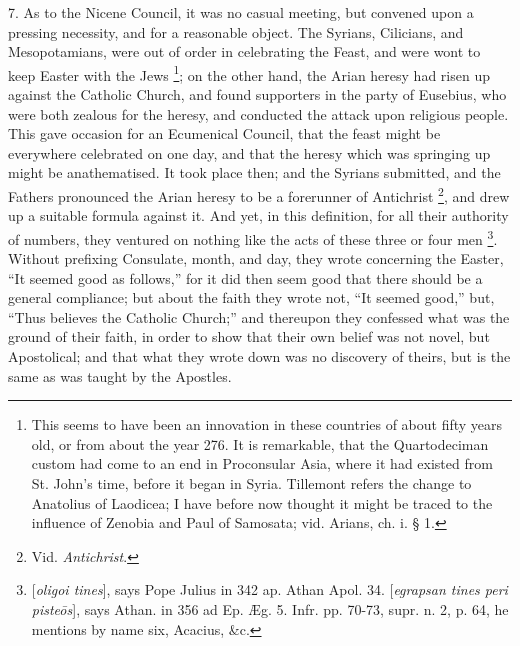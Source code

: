 7. As to the Nicene Council,
it was no casual meeting, but convened upon a pressing necessity, and
for a reasonable object. The Syrians, Cilicians, and Mesopotamians,
were out of order in celebrating the Feast, and were wont to keep
Easter with the Jews \footnote{This seems to have been an innovation in these countries of about
fifty years old, or from about the year 276. It is remarkable, that
the Quartodeciman custom had come to an end in Proconsular Asia, where
it had existed from St. John's time, before it began in Syria.
Tillemont refers the change to Anatolius of Laodicea; I have before
now thought it might be traced to the influence of Zenobia and Paul of
Samosata; vid. Arians, ch. i. § 1.}; on
the other hand, the Arian heresy had risen up against the
Catholic Church, and found supporters in the party of Eusebius, who
were both zealous for the heresy, and conducted the attack upon
religious people. This gave occasion for an Ecumenical Council, that
the feast might be everywhere celebrated on one day, and that the
heresy which was springing up might be anathematised. It took place
then; and the Syrians submitted, and the Fathers pronounced the Arian
heresy to be a forerunner of Antichrist \footnote{Vid. \emph{Antichrist}.}, and drew up a suitable formula against it. And yet, in this
definition, for all their authority of numbers, they ventured on
nothing like the acts of these three or four men \footnote{[\emph{oligoi tines}], says Pope Julius in 342 ap. Athan Apol. 34. [\emph{egrapsan
tines peri piste\={o}s}], says Athan. in 356 ad Ep. Æg. 5. Infr.
pp. 70-73, supr. n. 2, p. 64, he mentions by name six, Acacius,
\&c.}. Without prefixing Consulate, month, and day, they wrote
concerning the Easter, ``It seemed good as follows,'' for it did then
seem good that there should be a general compliance; but about the
faith they wrote not, ``It seemed good,'' but, ``Thus believes the
Catholic Church;'' and thereupon they confessed what was the ground of
their faith, in order to show that their own belief was not novel, but
Apostolical; and that what they wrote down was no discovery of theirs,
but is the same as was taught by the Apostles.

